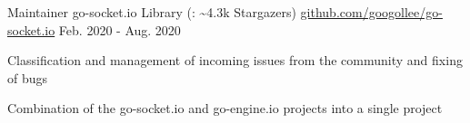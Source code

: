 

\begin{cventries}

  \cventry
  {Maintainer} %
  {\faGithub{} go-socket.io Library (\faStar{}: \textasciitilde 4.3k Stargazers)} %
  {\href{https://github.com/googollee/go-socket.io}{github.com/googollee/go-socket.io}} %
  {Feb. 2020 - Aug. 2020} %
  {
    \begin{cvitems} %
      \item {Classification and management of incoming issues from the community and fixing of bugs}
      \item {Combination of the go-socket.io and go-engine.io projects into a single project}
    \end{cvitems}
  }

\end{cventries}
